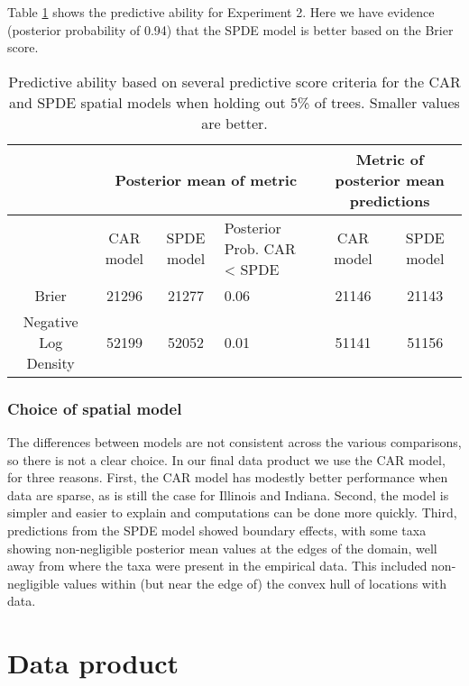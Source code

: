 \documentclass[12pt]{article}\usepackage[]{graphicx}\usepackage[]{color}
\providecommand{\tabularnewline}{\\}
\begin{document}
Table \ref{tab:score_tree} shows the predictive ability for Experiment
2. Here we have evidence (posterior probability of 0.94) that the
SPDE model is better based on the Brier score.



\begin{table}
\caption{Predictive ability based on several predictive score criteria for
the CAR and SPDE spatial models when holding out 5\% of trees. Smaller
values are better.}


\begin{tabular}{|c|c|c|>{\centering}p{3cm}|c|c|}
\hline 
 &
\multicolumn{3}{c|}{{\small{Posterior mean of metric}}} &
\multicolumn{2}{c|}{{\small{Metric of posterior mean predictions}}}\tabularnewline
\hline 
\hline 
 &
{\small{CAR model}} &
{\small{SPDE model}} &
{\small{Posterior Prob. CAR < SPDE}} &
{\small{CAR model}} &
{\small{SPDE model}}\tabularnewline
\hline 
{\small{Brier}} &
{\small{21296}} &
{\small{21277}} &
{\small{0.06}} &
{\small{21146}} &
{\small{21143}}\tabularnewline
\hline 
{\small{Negative Log Density}} &
{\small{52199}} &
{\small{52052}} &
{\small{0.01}} &
{\small{51141}} &
{\small{51156}}\tabularnewline
\hline 
\end{tabular}

\label{tab:score_tree}
\end{table}



\subsubsection{Choice of spatial model}

The differences between models are not consistent across the various
comparisons, so there is not a clear choice. In our final data product
we use the CAR model, for three reasons. First, the CAR model has
modestly better performance when data are sparse, as is still the
case for Illinois and Indiana. Second, the model is simpler and easier
to explain and computations can be done more quickly. Third, predictions
from the SPDE model showed boundary effects, with some taxa showing
non-negligible posterior mean values at the edges of the domain, well
away from where the taxa were present in the empirical data. This
included non-negligible values within (but near the edge of) the convex
hull of locations with data. 


\section{Data product}
\end{document}
